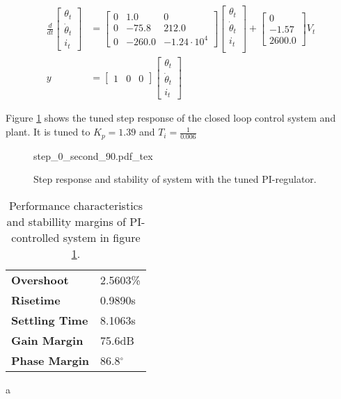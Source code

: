 \documentclass[../../../Main]{subfiles}
\begin{document}
\begin{equation}
      \label{eq:90_linearized}
      \begin{split}
      \frac{d}{dt}
    \begin{bmatrix}
        \theta_t \\
        \dot \theta_t \\
        i_t
    \end{bmatrix}
    &=
    \begin{bmatrix}0 & 1.0 & 0\\ 0  & -75.8 & 212.0\\ 0 & -260.0 & -1.24 \cdot 10^4 \end{bmatrix}
    \begin{bmatrix}
        \theta_t \\
        \dot \theta_t \\
        i_t \\
    \end{bmatrix}
    +
    \begin{bmatrix}
     0\\ -1.57\\ 2600.0
    \end{bmatrix}
    V_t \\
		y &=
    \begin{bmatrix}
        1 & 0 & 0
    \end{bmatrix}
    \begin{bmatrix}
        \theta_t \\
        \dot \theta_t\\
        i_t
    \end{bmatrix}
    \end{split}
\end{equation}

Figure \ref{fig:step_0_second_90} shows the tuned step response of the closed loop control system and plant.
It is tuned to $K_p = 1.39$ and $T_i = \frac{1}{0.006}$
\begin{figure}[H]
\centering
\def\svgwidth{\textwidth}
{step_0_second_90.pdf_tex}
\caption{Step response and stability  of system with the tuned PI-regulator.}
\label{fig:step_0_second_90}
\end{figure}


\begin{table}[h]
	 \centering
	 \begin{tabular}{ll}
		 \textbf{Overshoot} & 2.5603\%\\
		 \textbf{Risetime}  & 0.9890s\\
		 \textbf{Settling Time} & 8.1063s\\
		 \textbf{Gain Margin} & 75.6dB\\
		 \textbf{Phase Margin} & 86.8$^\circ$
	 \end{tabular}
	 \caption{Performance characteristics and stabillity margins of PI-controlled system in figure \ref{fig:step_0_second_90}.}
	 \label{tab:performance_0_3}a
\end{table}
\end{document}

